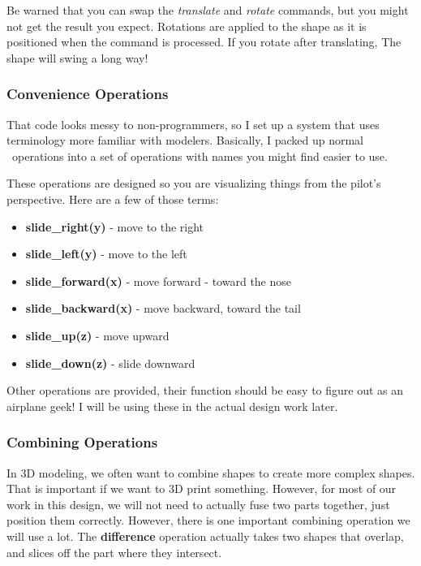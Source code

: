 Be warned that you can swap the {\it translate} and {\it rotate} commands, but
you might not get the result you expect. Rotations are applied to the shape as
it is positioned when the command is processed. If you rotate after
translating, The shape will swing a long way!

\subsubsection{Convenience Operations}

That code looks messy to non-programmers, so I set up a system that uses
terminology more familiar with modelers. Basically, I packed up normal \osc\
operations into a set of operations with names you might find easier to use.

These operations are designed so you are visualizing things from the pilot's
perspective.  Here are a few of those terms:

\begin{itemize}
  \item{{\bf slide\_right(y)} - move to the right}
  \item{{\bf slide\_left(y)} - move to the left}
  \item{{\bf slide\_forward(x)} - move forward - toward the nose}
  \item{{\bf slide\_backward(x)} - move backward, toward the tail}
  \item{{\bf slide\_up(z)} - move upward}
  \item{{\bf slide\_down(z)} - slide downward}
\end{itemize}

Other operations are provided, their function should be easy to figure out as
an airplane geek! I will be using these in the actual design work later.

\subsubsection{Combining Operations}

In 3D modeling, we often want to combine shapes to create more complex shapes.
That is important if we want to 3D print something. However, for most of our
work in this design, we will not need to actually fuse two parts together, just
position them correctly. However, there is one important combining operation we
will use a lot. The {\bf difference} operation actually takes two shapes that
overlap, and slices off the part where they intersect.

